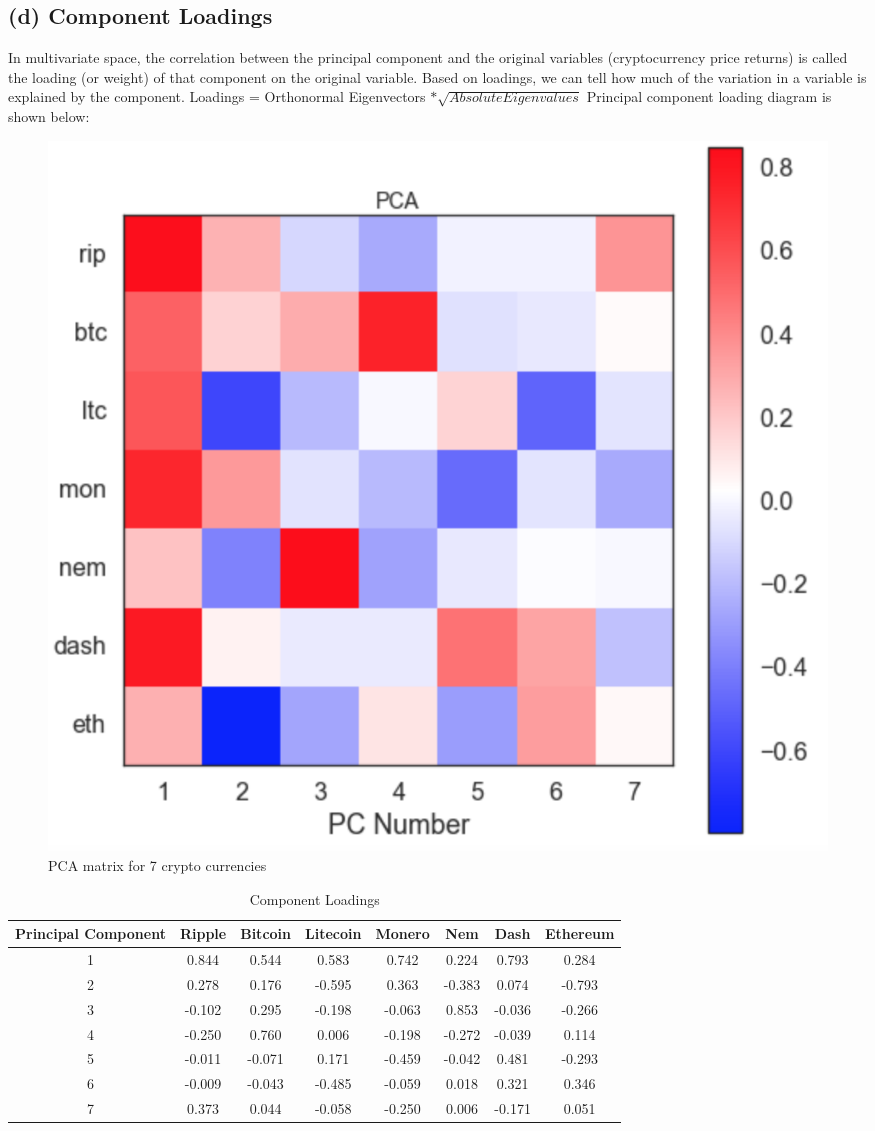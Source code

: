 \documentclass[12pt,twoside]{article}
\newcommand{\head}[1]{\textnormal{\textbf{#1}}}
\begin{document}
\subsection{(d) Component Loadings}
\bigbreak
In multivariate space, the correlation between the principal component and the original variables (cryptocurrency price returns) is called the loading (or weight) of that component on the original variable. Based on loadings, we can tell how much of the variation in a variable is explained by the component.
\bigbreak
Loadings = Orthonormal Eigenvectors $* \sqrt{Absolute Eigen values}$
\bigbreak
Principal component loading diagram is shown below:
\begin{figure}[H]
\begin{center}
\includegraphics[scale=.6]{pca_loadings.png}
\end{center}
\caption{PCA matrix for 7 crypto currencies}
\end{figure}
\begin{table}[H]
\begin{tabular}{cccccccc}
\hline
\head{Principal Component} & \head{Ripple} & \head{Bitcoin} & \head{Litecoin} &\head{Monero} &\head{Nem} &\head{Dash} &\head{Ethereum}\\
\hline
1 & 0.844&0.544&0.583&0.742&0.224&0.793&0.284\\
2 & 0.278&0.176&-0.595&0.363&-0.383&0.074&-0.793\\
3 & -0.102	&0.295&-0.198&-0.063&0.853&-0.036&-0.266\\
4 & -0.250&0.760&0.006&-0.198&-0.272&-0.039&0.114\\
5 & -0.011	&-0.071&0.171&-0.459&-0.042&0.481&-0.293\\
6 & -0.009&-0.043&-0.485&-0.059&0.018&0.321&0.346\\
7 & 0.373&0.044&-0.058&-0.250&0.006&-0.171&0.051\\
\hline
\end{tabular}
\caption{Component Loadings}
\end{table}
\end{document}
